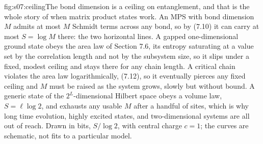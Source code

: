 %
\begin{aqmfigure}{fig:s07:ceiling}{The bond dimension is a ceiling on entanglement, and that is the
whole story of when matrix product states work. An MPS with bond dimension $M$ admits at most $M$
Schmidt terms across any bond, so by (7.10) it can carry at most $S=\log M$ there: the two horizontal
lines. A gapped one-dimensional ground state obeys the area law of Section 7.6, its entropy
saturating at a value set by the correlation length and not by the subsystem size, so it slips under
a fixed, modest ceiling and stays there for any chain length. A critical chain violates the area law
logarithmically, (7.12), so it eventually pierces any fixed ceiling and $M$ must be raised as the
system grows, slowly but without bound. A generic state of the $2^L$-dimensional Hilbert space obeys
a volume law, $S=\ell\log 2$, and exhausts any usable $M$ after a handful of sites, which is why long
time evolution, highly excited states, and two-dimensional systems are all out of reach. Drawn in
bits, $S/\log 2$, with central charge $c=1$; the curves are schematic, not fits to a particular
model.}

\end{aqmfigure}
